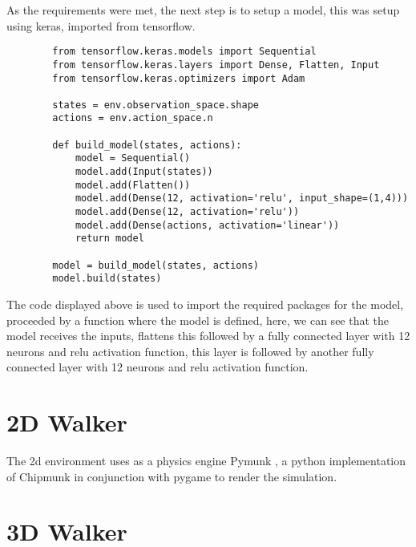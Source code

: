     As the requirements were met, the next step is to setup a model, this was setup using keras, imported from tensorflow.
    \pagebreak
    \lstset{language=Python}
    \lstset{frame=lines}
    \lstset{basicstyle=\footnotesize}
    \begin{lstlisting}
        from tensorflow.keras.models import Sequential
        from tensorflow.keras.layers import Dense, Flatten, Input
        from tensorflow.keras.optimizers import Adam

        states = env.observation_space.shape
        actions = env.action_space.n

        def build_model(states, actions):
            model = Sequential() 
            model.add(Input(states))
            model.add(Flatten())
            model.add(Dense(12, activation='relu', input_shape=(1,4)))
            model.add(Dense(12, activation='relu'))
            model.add(Dense(actions, activation='linear'))
            return model

        model = build_model(states, actions)
        model.build(states)
    \end{lstlisting}

    The code displayed above is used to import the required packages for the model, proceeded by a function where the model is defined, here, we can see that the model receives the inputs, flattens this followed by a fully connected layer with 12 neurons and relu activation function,
    this layer is followed by another fully connected layer with 12 neurons and relu activation function.



\section{2D Walker}
The 2d environment uses as a physics engine Pymunk \cite{pymunk}, a python implementation of Chipmunk\cite{chipmunk} 
in conjunction with pygame \cite{pygame} to render the simulation. 

\section{3D Walker}

